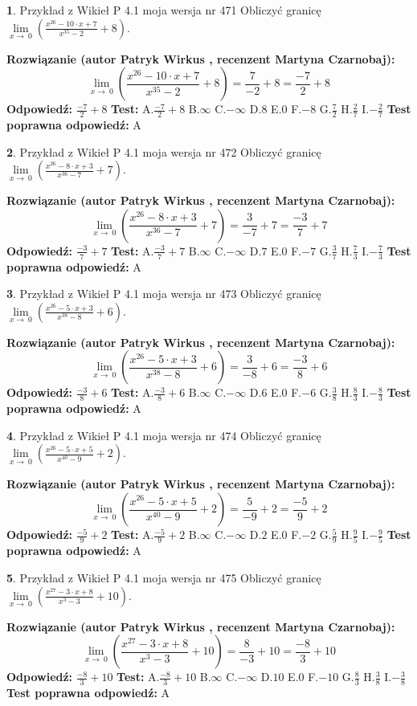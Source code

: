 \documentclass[12pt, a4paper]{article}
\theoremstyle{definition} %
\newtheorem{zad}{}
\newcommand{\zadStart}[1]{\begin{zad}#1\newline}
\newcommand{\zadStop}{\end{zad}}
\newcommand{\rozwStart}[2]{\noindent \textbf{Rozwiązanie (autor #1 , recenzent #2): }\newline}
\newcommand{\rozwStop}{\newline}
\newcommand{\odpStart}{\noindent \textbf{Odpowiedź:}\newline}
\newcommand{\odpStop}{\newline}
\newcommand{\testStart}{\noindent \textbf{Test:}\newline}
\newcommand{\testStop}{\newline}
\newcommand{\kluczStart}{\noindent \textbf{Test poprawna odpowiedź:}\newline}
\newcommand{\kluczStop}{\newline}
\begin{document}
\zadStart{Przykład z Wikieł P 4.1 moja wersja nr 471}
Obliczyć granicę $\lim\limits_{x\to\ 0}(\frac{x^{26}-10 \cdot x +7}{x^{35}-2}+8)$.
\zadStop
\rozwStart{Patryk Wirkus}{Martyna Czarnobaj}
$$\lim\limits_{x\to\ 0}(\frac{x^{26}-10 \cdot x +7}{x^{35}-2}+8)=\frac{7}{-2}+8=\frac{-7}{2}+8$$
\rozwStop
\odpStart
$\frac{-7}{2}+8$
\odpStop
\testStart
A.$\frac{-7}{2}+8$
B.$\infty$
C.$-\infty$
D.$8$
E.$0$
F.$-8$
G.$\frac{7}{2}$
H.$\frac{2}{7}$
I.$-\frac{2}{7}$
\testStop
\kluczStart
A
\kluczStop



\zadStart{Przykład z Wikieł P 4.1 moja wersja nr 472}
Obliczyć granicę $\lim\limits_{x\to\ 0}(\frac{x^{26}-8 \cdot x +3}{x^{36}-7}+7)$.
\zadStop
\rozwStart{Patryk Wirkus}{Martyna Czarnobaj}
$$\lim\limits_{x\to\ 0}(\frac{x^{26}-8 \cdot x +3}{x^{36}-7}+7)=\frac{3}{-7}+7=\frac{-3}{7}+7$$
\rozwStop
\odpStart
$\frac{-3}{7}+7$
\odpStop
\testStart
A.$\frac{-3}{7}+7$
B.$\infty$
C.$-\infty$
D.$7$
E.$0$
F.$-7$
G.$\frac{3}{7}$
H.$\frac{7}{3}$
I.$-\frac{7}{3}$
\testStop
\kluczStart
A
\kluczStop



\zadStart{Przykład z Wikieł P 4.1 moja wersja nr 473}
Obliczyć granicę $\lim\limits_{x\to\ 0}(\frac{x^{26}-5 \cdot x +3}{x^{38}-8}+6)$.
\zadStop
\rozwStart{Patryk Wirkus}{Martyna Czarnobaj}
$$\lim\limits_{x\to\ 0}(\frac{x^{26}-5 \cdot x +3}{x^{38}-8}+6)=\frac{3}{-8}+6=\frac{-3}{8}+6$$
\rozwStop
\odpStart
$\frac{-3}{8}+6$
\odpStop
\testStart
A.$\frac{-3}{8}+6$
B.$\infty$
C.$-\infty$
D.$6$
E.$0$
F.$-6$
G.$\frac{3}{8}$
H.$\frac{8}{3}$
I.$-\frac{8}{3}$
\testStop
\kluczStart
A
\kluczStop



\zadStart{Przykład z Wikieł P 4.1 moja wersja nr 474}
Obliczyć granicę $\lim\limits_{x\to\ 0}(\frac{x^{26}-5 \cdot x +5}{x^{40}-9}+2)$.
\zadStop
\rozwStart{Patryk Wirkus}{Martyna Czarnobaj}
$$\lim\limits_{x\to\ 0}(\frac{x^{26}-5 \cdot x +5}{x^{40}-9}+2)=\frac{5}{-9}+2=\frac{-5}{9}+2$$
\rozwStop
\odpStart
$\frac{-5}{9}+2$
\odpStop
\testStart
A.$\frac{-5}{9}+2$
B.$\infty$
C.$-\infty$
D.$2$
E.$0$
F.$-2$
G.$\frac{5}{9}$
H.$\frac{9}{5}$
I.$-\frac{9}{5}$
\testStop
\kluczStart
A
\kluczStop



\zadStart{Przykład z Wikieł P 4.1 moja wersja nr 475}
Obliczyć granicę $\lim\limits_{x\to\ 0}(\frac{x^{27}-3 \cdot x +8}{x^{3}-3}+10)$.
\zadStop
\rozwStart{Patryk Wirkus}{Martyna Czarnobaj}
$$\lim\limits_{x\to\ 0}(\frac{x^{27}-3 \cdot x +8}{x^{3}-3}+10)=\frac{8}{-3}+10=\frac{-8}{3}+10$$
\rozwStop
\odpStart
$\frac{-8}{3}+10$
\odpStop
\testStart
A.$\frac{-8}{3}+10$
B.$\infty$
C.$-\infty$
D.$10$
E.$0$
F.$-10$
G.$\frac{8}{3}$
H.$\frac{3}{8}$
I.$-\frac{3}{8}$
\testStop
\kluczStart
A
\kluczStop
\end{document}
